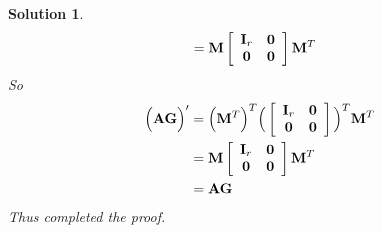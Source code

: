 \documentclass[11pt]{article}
\newtheorem{sol}{Solution}
\begin{document}
\begin{sol}
\begin{align*}
	 	&= {\bf M}\left[\begin{array}{cc} {\bf I}_r& {\bf 0}\\ {\bf 0}& {\bf 0}\end{array}\right]{\bf M}^{T}
	 \end{align*}
	 So
	 \begin{align*}
	 	\Big({\bf A}{\bf G}\Big)' &= \Big({\bf M}^T\Big)^T\Big(\left[\begin{array}{cc} {\bf I}_r& {\bf 0}\\ {\bf 0}& {\bf 0}\end{array}\right]\Big)^T{\bf M}^T\\
	 	&= {\bf M}\left[\begin{array}{cc} {\bf I}_r& {\bf 0}\\ {\bf 0}& {\bf 0}\end{array}\right]{\bf M}^{T}\\
	 	&= {\bf A}{\bf G}
	 \end{align*}
	 Thus completed the proof.
\end{sol}
\end{document}
